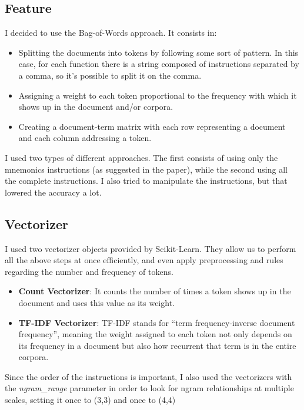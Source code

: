\documentclass[11pt]{article}
\begin{document}
\subsection{Feature}
I decided to use the Bag-of-Words approach. It consists in:
\begin{itemize}
	\item Splitting the documents into tokens by following some sort of pattern. In this case, for each function there is a string composed of instructions separated by a comma, so it's possible to split it on the comma.
	\item Assigning a weight to each token proportional to the frequency with which it shows up in the document and/or corpora.
	\item Creating a document-term matrix with each row representing a document and each column addressing a token.
\end{itemize}
I used two types of different approaches. The first consists of using only the mnemonics instructions (as suggested in the paper), while the second using all the complete instructions. I also tried to manipulate the instructions, but that lowered the accuracy a lot.

\subsection{Vectorizer}
I used two vectorizer objects provided by Scikit-Learn. They allow us to perform all the above steps at once efficiently, and even apply preprocessing and rules regarding the number and frequency of tokens.

\begin{itemize}
	\item \textbf{Count Vectorizer}: It counts the number of times a token shows up in the document and uses this value as its weight.
	\item \textbf{TF-IDF Vectorizer}: TF-IDF stands for “term frequency-inverse document frequency”, meaning the weight assigned to each token not only depends on its frequency in a document but also how recurrent that term is in the entire corpora.
\end{itemize}

Since the order of the instructions is important, I also used the vectorizers with the \textit{ngram\_range} parameter in order to look for ngram relationships at multiple scales, setting it once to (3,3) and once to (4,4)
\end{document}
